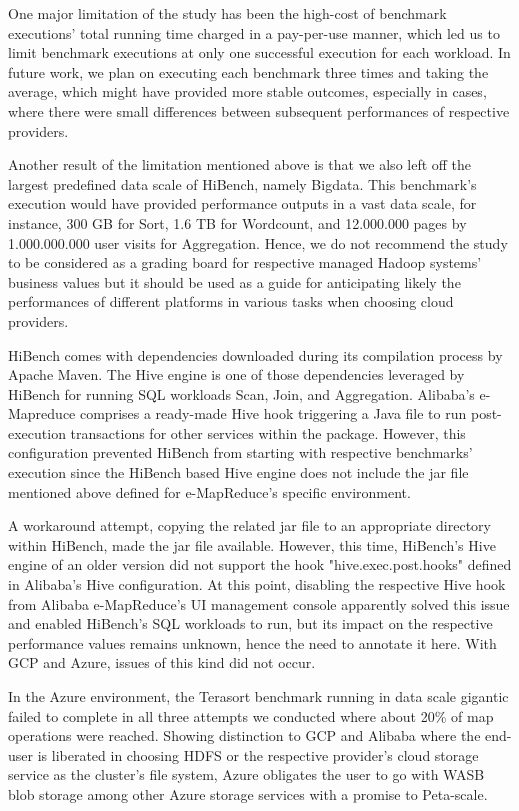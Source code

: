 \documentclass[review]{elsarticle}
\begin{document}
	One major limitation of the study has been the high-cost of benchmark executions' total running time charged in a pay-per-use manner, which led us to limit benchmark executions at only one successful execution for each workload. In future work, we plan on executing each benchmark three times and taking the average, which might have provided more stable outcomes, especially in cases, where there were small differences between subsequent performances of respective providers. 
	
	Another result of the limitation mentioned above is that we also left off the largest predefined data scale of HiBench, namely Bigdata. This benchmark's execution would have provided performance outputs in a vast data scale, for instance, 300 GB for Sort, 1.6 TB for Wordcount, and 12.000.000 pages by 1.000.000.000 user visits for Aggregation. Hence, we do not recommend the study to be considered as a grading board for respective managed Hadoop systems' business values but it should be used as a guide for anticipating likely the performances of different platforms in various tasks when choosing cloud providers.
	
	HiBench comes with dependencies downloaded during its compilation process by Apache Maven. The Hive engine is one of those dependencies leveraged by HiBench for running SQL workloads Scan, Join, and Aggregation. Alibaba's e-Mapreduce comprises a ready-made Hive hook triggering a Java file to run post-execution transactions for other services within the package. However, this configuration prevented HiBench from starting with respective benchmarks' execution since the HiBench based Hive engine does not include the jar file mentioned above defined for e-MapReduce's specific environment. 
	
	A workaround attempt, copying the related jar file to an appropriate directory within HiBench, made the jar file available. However, this time, HiBench's Hive engine of an older version did not support the hook "hive.exec.post.hooks" defined in Alibaba's Hive configuration. At this point, disabling the respective Hive hook from Alibaba e-MapReduce's UI management console apparently solved this issue and enabled HiBench's SQL workloads to run, but its impact on the respective performance values remains unknown, hence the need to annotate it here. With GCP and Azure, issues of this kind did not occur.
	
	In the Azure environment, the Terasort benchmark running in data scale gigantic failed to complete in all three attempts we conducted where about 20\% of map operations were reached. Showing distinction to GCP and Alibaba where the end-user is liberated in choosing HDFS or the respective provider's cloud storage service as the cluster's file system, Azure obligates the user to go with WASB blob storage among other Azure storage services with a promise to Peta-scale. 
	
\end{document}
